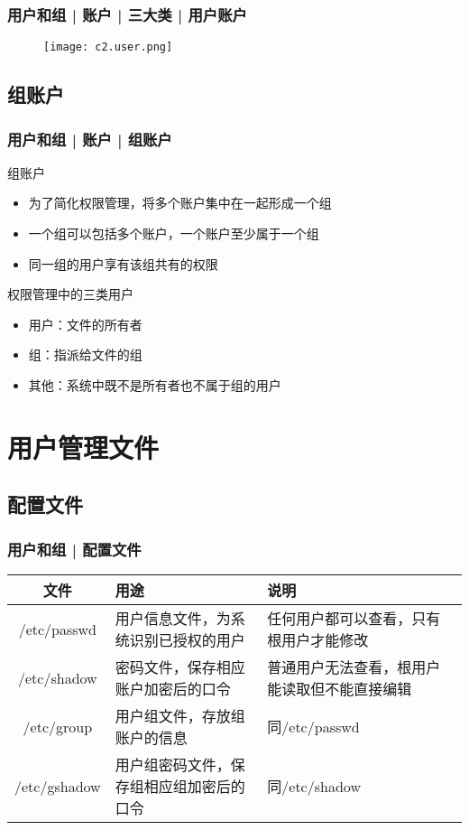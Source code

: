 \begin{frame}
  \frametitle{用户和组 | 账户 | 三大类 | 用户账户}
  \begin{figure}
    \centering
    \texttt{[image: c2.user.png]}
  \end{figure}
\end{frame}

\subsection{组账户}
\begin{frame}
  \frametitle{用户和组 | 账户 | 组账户}
  \begin{block}{组账户}
    \begin{itemize}
      \item 为了简化权限管理，将多个账户集中在一起形成一个组
      \item 一个组可以包括多个账户，一个账户至少属于一个组
      \item 同一组的用户享有该组共有的权限
    \end{itemize}
  \end{block}
  \pause
  \begin{block}{权限管理中的\alert{三类用户}}
    \begin{itemize}
      \item 用户：文件的所有者
      \item 组：指派给文件的组
      \item 其他：系统中既不是所有者也不属于组的用户
    \end{itemize}
  \end{block}
\end{frame}

\section{用户管理文件}
\subsection{配置文件}
\begin{frame}
  \frametitle{用户和组 | \alert{配置文件}}
  \begin{table}
    \centering
    \begin{tabularx}{\textwidth}{cXX}
      \hline
      \rowcolor{blue!50}文件 & 用途 & 说明\\
      \hline
      /etc/passwd & 用户信息文件，为系统识别已授权的用户 & 任何用户都可以查看，只有根用户才能修改\\
      /etc/shadow & 密码文件，保存相应账户加密后的口令 & 普通用户无法查看，根用户能读取但不能直接编辑\\
      /etc/group & 用户组文件，存放组账户的信息 & 同/etc/passwd\\
      /etc/gshadow & 用户组密码文件，保存组相应组加密后的口令 & 同/etc/shadow\\
      \hline
    \end{tabularx}
  \end{table}
\end{frame}

